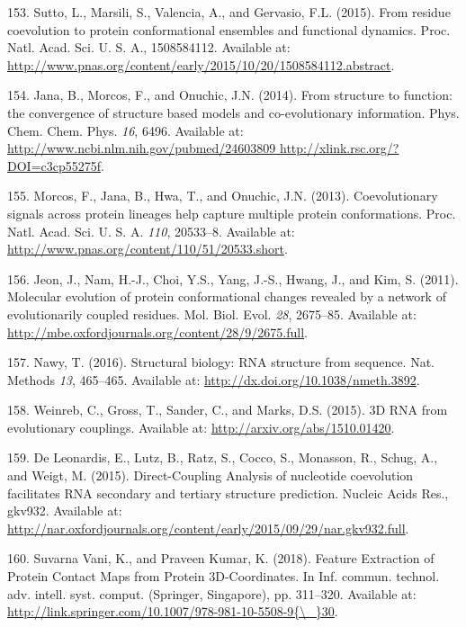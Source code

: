 \documentclass[11pt,a4paper,twoside]{book}
\theoremstyle{definition}
\theoremstyle{definition}
\theoremstyle{remark}
\begin{document}
\hypertarget{ref-Sutto2015}{}
153. Sutto, L., Marsili, S., Valencia, A., and Gervasio, F.L. (2015).
From residue coevolution to protein conformational ensembles and
functional dynamics. Proc. Natl. Acad. Sci. U. S. A., 1508584112.
Available at:
\url{http://www.pnas.org/content/early/2015/10/20/1508584112.abstract}.

\hypertarget{ref-Jana2014}{}
154. Jana, B., Morcos, F., and Onuchic, J.N. (2014). From structure to
function: the convergence of structure based models and co-evolutionary
information. Phys. Chem. Chem. Phys. \emph{16}, 6496. Available at:
\href{http://www.ncbi.nlm.nih.gov/pubmed/24603809\%20http://xlink.rsc.org/?DOI=c3cp55275f}{http://www.ncbi.nlm.nih.gov/pubmed/24603809 http://xlink.rsc.org/?DOI=c3cp55275f}.

\hypertarget{ref-Morcos2013a}{}
155. Morcos, F., Jana, B., Hwa, T., and Onuchic, J.N. (2013).
Coevolutionary signals across protein lineages help capture multiple
protein conformations. Proc. Natl. Acad. Sci. U. S. A. \emph{110},
20533--8. Available at:
\url{http://www.pnas.org/content/110/51/20533.short}.

\hypertarget{ref-Jeon2011a}{}
156. Jeon, J., Nam, H.-J., Choi, Y.S., Yang, J.-S., Hwang, J., and Kim,
S. (2011). Molecular evolution of protein conformational changes
revealed by a network of evolutionarily coupled residues. Mol. Biol.
Evol. \emph{28}, 2675--85. Available at:
\url{http://mbe.oxfordjournals.org/content/28/9/2675.full}.

\hypertarget{ref-Nawy2016}{}
157. Nawy, T. (2016). Structural biology: RNA structure from sequence.
Nat. Methods \emph{13}, 465--465. Available at:
\url{http://dx.doi.org/10.1038/nmeth.3892}.

\hypertarget{ref-Weinreb2015}{}
158. Weinreb, C., Gross, T., Sander, C., and Marks, D.S. (2015). 3D RNA
from evolutionary couplings. Available at:
\url{http://arxiv.org/abs/1510.01420}.

\hypertarget{ref-DeLeonardis2015a}{}
159. De Leonardis, E., Lutz, B., Ratz, S., Cocco, S., Monasson, R.,
Schug, A., and Weigt, M. (2015). Direct-Coupling Analysis of nucleotide
coevolution facilitates RNA secondary and tertiary structure prediction.
Nucleic Acids Res., gkv932. Available at:
\url{http://nar.oxfordjournals.org/content/early/2015/09/29/nar.gkv932.full}.

\hypertarget{ref-SuvarnaVani2018}{}
160. Suvarna Vani, K., and Praveen Kumar, K. (2018). Feature Extraction
of Protein Contact Maps from Protein 3D-Coordinates. In Inf. commun.
technol. adv. intell. syst. comput. (Springer, Singapore), pp. 311--320.
Available at:
\href{http://link.springer.com/10.1007/978-981-10-5508-9\%7B/_\%7D30}{http://link.springer.com/10.1007/978-981-10-5508-9\{\textbackslash{}\_\}30}.
\end{document}
